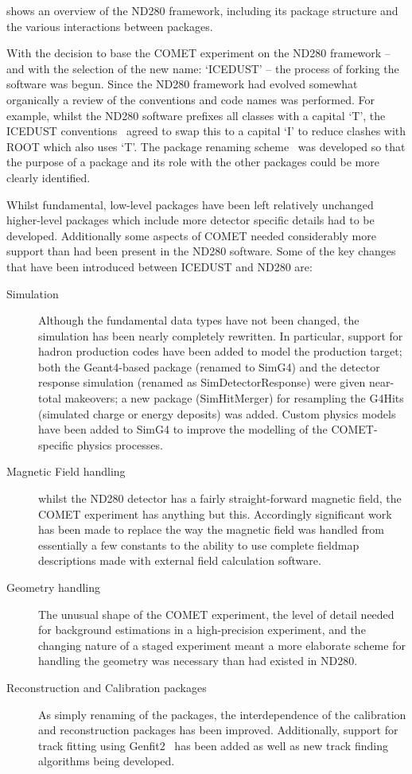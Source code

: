 \FigNDTwoEighty
{} shows an overview of the ND280 framework, including its package structure and the various interactions between packages.

With the decision to base the COMET experiment on the ND280 framework -- and with the selection of the new name: `ICEDUST' -- the process of forking the software was begun.
Since the ND280 framework had evolved somewhat organically a review of the conventions and code names was performed.
For example, whilst the ND280 software prefixes all classes with a capital `T', the ICEDUST conventions~\cite{ID:conventions} agreed to swap this to a capital `I' to reduce clashes with ROOT which also uses `T'.
The package renaming scheme~\cite{ID:packageRenaming} was developed so that the purpose of a package and its role with the other packages could be more clearly identified.

Whilst fundamental, low-level packages have been left relatively unchanged higher-level packages which include more detector specific details had to be developed.
Additionally some aspects of COMET needed considerably more support than had been present in the ND280 software.
Some of the key changes that have been introduced between ICEDUST and ND280 are:
\begin{description}
	\item [Simulation] Although the fundamental data types have not been changed, the simulation has been nearly completely rewritten.
		In particular, support for hadron production codes have been added to model the production target;
		both the Geant4-based package (renamed to SimG4) and the detector response simulation (renamed as SimDetectorResponse) were given near-total makeovers;
		a new package (SimHitMerger) for resampling the G4Hits (simulated charge or energy deposits) was added.
		Custom physics models have been added to SimG4 to improve the modelling of the COMET-specific physics processes.
	\item [Magnetic Field handling]  whilst the ND280 detector has a fairly straight-forward magnetic field, the COMET experiment has anything but this.  
		Accordingly significant work has been made to replace the way
		the magnetic field was handled from essentially a few constants
		to the ability to use complete fieldmap descriptions made with
		external field calculation software.
	\item [Geometry handling] The unusual shape of the COMET experiment, the level of detail needed for background estimations in a high-precision experiment, and the changing nature of a staged experiment meant a more elaborate scheme for handling the geometry was necessary than had existed in ND280.
	\item [Reconstruction and Calibration packages] As simply renaming of the packages, the interdependence of the calibration and reconstruction packages has been improved.
		Additionally, support for track fitting using Genfit2~\cite{genfit-Hoppner:2009af} has been added as well as new track finding algorithms being developed.
\end{description}

